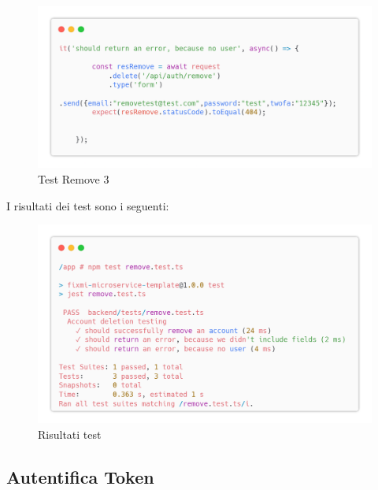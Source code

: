 \documentclass{report}
\begin{document}
\begin{figure}[H]
	\centering\includegraphics[width=1\textwidth]{images/microservizio-autenticazione/tests/remove_test_3.png}
	\caption{Test Remove 3}
\end{figure}
I risultati dei test sono i seguenti:
\begin{figure}[H]
	\centering\includegraphics[width=1\textwidth]{images/microservizio-autenticazione/tests/remove_test_results.png}
	\caption{Risultati test}
\end{figure}
\subsection{Autentifica Token}
\end{document}
